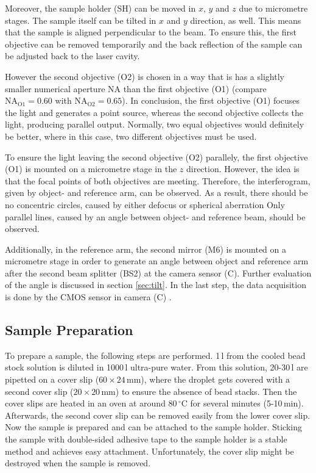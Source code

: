 \documentclass{article}
\begin{document}
Moreover, the sample holder (SH) can be moved in $x$, $y$ and $z$ due to micrometre stages. The sample itself can be tilted in $x$ and $y$ direction, as well. This means that the sample is aligned perpendicular to the beam. To ensure this, the first objective can be removed temporarily and the back reflection of the sample can be adjusted back to the laser cavity.

However the second objective (O2) is chosen in a way that is has a slightly smaller numerical aperture NA than the first objective (O1) (compare $\text{NA}_\text{O1}=0.60$ with $\text{NA}_\text{O2}=0.65$). In conclusion, the first objective (O1) focuses the light and generates a point source, whereas the second objective collects the light, producing parallel output. Normally, two equal objectives would definitely be better, where in this case, two different objectives must be used.

To ensure the light leaving the second objective (O2) parallely, the first objective (O1) is mounted on a micrometre stage in the $z$ direction. However, the idea is that the focal points of both objectives are meeting. Therefore, the interferogram, given by object- and reference arm, can be observed. As a result, there should be no concentric circles, caused by either defocus or spherical aberration Only parallel lines, caused by an angle between object- and reference beam, should be observed.

Additionally, in the reference arm, the second mirror (M6) is mounted on a micrometre stage in order to generate an angle between object and reference arm after the second beam splitter (BS2) \cite{BS013} at the camera sensor (C). Further evaluation of the angle is discussed in section \ref{sec:tilt}. In the last step, the data acquisition is done by the CMOS sensor in camera (C) \cite{pointGrey}.

\subsection{Sample Preparation}
To prepare a sample, the following steps are performed. 1\,\textmu l from the cooled bead stock solution is diluted in 1000\,\textmu l ultra-pure water. From this solution, 20-30\,\textmu l are pipetted on a cover slip ($60\times24\,$mm), where the droplet gets covered with a second cover slip ($20\times20\,$mm) to ensure the absence of bead stacks. Then the cover slips are heated in an oven at around 80$\,^\circ$C for several minutes (5-10\,min). Afterwards, the second cover slip can be removed easily from the lower cover slip. Now the sample is prepared and can be attached to the sample holder. Sticking the sample with double-sided adhesive tape to the sample holder is a stable method and achieves easy attachment. Unfortunately, the cover slip might be destroyed when the sample is removed.
\end{document}
